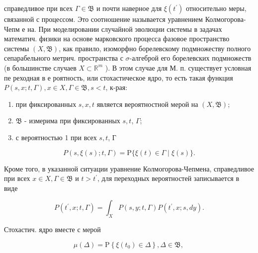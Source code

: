 \documentclass[10pt]{article}
\begin{document}
справедливое при всех $\Gamma \in \mathfrak{B}$ и почти наверное для $\xi\left(t^{\prime}\right)$ относительно меры, связанной с процессом. Это соотношение называется уравнением Колмогорова-Чепм е на. При моделировании случайной эволюции системы в задачах математич. физики на основе марковского процесса фазовое пространство системы $(X, \mathfrak{B})$, как правило, изоморфно борелевскому подмножеству полного сепарабельного метрич. пространства с $\sigma$-алгеброй его борелевских подмножеств (в большинстве случаев $X \subset \mathbb{R}^{m}$ ). В этом случае для М. п. существует условная пе реходная в е роятность, или стохастическое ядро, то есть такая функция $P(s, x ; t, \Gamma), x \in X, \Gamma \in \mathfrak{B}, s<t$, к-рая:



\begin{enumerate}

  \item при фиксированных $s, x, t$ является вероятностной мерой на $(X, \mathfrak{B})$;



  \item $\mathfrak{B}$ - измерима при фиксированных $s, t$, $\Gamma$;



  \item с вероятностью 1 при всех $s, t$, Г



\end{enumerate}



\[

P(s, \xi(s) ; t, \Gamma)=\mathrm{P}\{\xi(t) \in \Gamma \mid \xi(s)\} .

\]



Кроме того, в указанной ситуации уравнение Колмогорова-Чепмена, справедливое при всех $x \in X, \Gamma \in \mathfrak{B}$ и $t>t^{\prime}$, для переходных вероятностей записывается в виде



\[

P\left(t^{\prime}, x ; t, \Gamma\right)=\int_{X} P(s, y ; t, \Gamma) P\left(t^{\prime}, x ; s, d y\right) .

\]



Стохастич. ядро вместе с мерой



\[

\mu(\Delta)=\mathrm{P}\left\{\xi\left(t_{0}\right) \in \Delta\right\}, \Delta \in \mathfrak{B} \text {, }

\]
\end{document}
